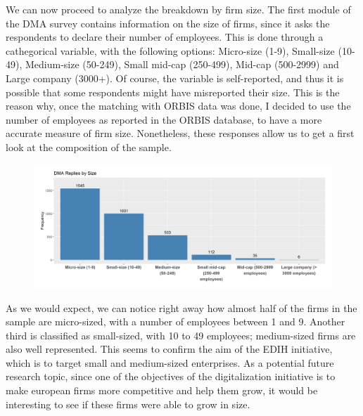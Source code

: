 \documentclass[12pt]{report}
\begin{document}
\par We can now proceed to analyze the breakdown by firm size. The first module of the DMA survey contains information on the size of firms, since it asks the respondents to declare their number of employees. This is done through a cathegorical variable, with the following options: Micro-size (1-9), Small-size (10-49), Medium-size (50-249), Small mid-cap (250-499), Mid-cap (500-2999) and Large company (3000+). Of course, the variable is self-reported, and thus it is possible that some respondents might have misreported their size. This is the reason why, once the matching with ORBIS data was done, I decided to use the number of employees as reported in the ORBIS database, to have a more accurate measure of firm size. Nonetheless, these responses allow us to get a first look at the composition of the sample.

\begin{figure}[h!]
    \centering
    \includegraphics[width=\linewidth]{../Output/dmafirmsizebargraph.png}
    \caption{}
    \label{fig:distr_employees}
\end{figure}

\par As we would expect, we can notice right away how almost half of the firms in the sample are micro-sized, with a number of employees between 1 and 9. Another third is classified as small-sized, with 10 to 49 employees; medium-sized firms are also well represented. This seems to confirm the aim of the EDIH initiative, which is to target small and medium-sized enterprises. As a potential future research topic, since one of the objectives of the digitalization initiative is to make european firms more competitive and help them grow, it would be interesting to see if these firms were able to grow in size.
\end{document}
